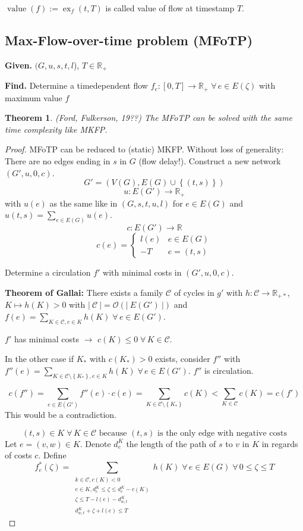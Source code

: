 \documentclass{article}
\newtheorem{theorem}{Theorem}
\newcommand{\card}[1]{\left|\:\!#1\:\!\right|}
\newcommand{\set}[1]{\left\{#1\right\}}
\newcommand{\given}[1]{\textbf{Given.} #1\par}
\newcommand{\find}[1]{\textbf{Find.} #1\par}
\newcommand{\fall}{\;\forall\,}
\begin{document}
$\operatorname{value}(f) := \operatorname{ex}_f(t, T)$ is called value of flow at timestamp $T$.

\subsection{Max-Flow-over-time problem (MFoTP)}
\given{$(G, u, s, t, l$), $T \in \mathbb{R}_+$}
\find{Determine a timedependent flow $f_e: [0, T] \rightarrow \mathbb{R}_+ \fall e \in E(\zeta)$ with maximum value $f$}

\begin{theorem}\label{satz-5.21}
  (Ford, Fulkerson, 19??)
  The MFoTP can be solved with the same time complexity like MKFP.
\end{theorem}

\begin{proof}
  MFoTP can be reduced to (static) MKFP.
  Without loss of generality: There are no edges ending in $s$ in $G$ (flow delay!).
  Construct a new network $(G', u, 0, c)$.
  \[ G' = (V(G), E(G) \cup \set{(t, s)}) \]
  \[ u: E(G') \rightarrow \mathbb{R}_+ \]
  with $u(e)$ as the same like in $(G, s, t, u, l)$ for $e \in E(G)$ and $u(t, s) = \sum_{e \in E(G)} u(e)$.
  \[ c: E(G') \rightarrow \mathbb{R} \]
  \[
    c(e) = \left\{\begin{array}{ll}
      l(e) & e \in E(G) \\
      -T & e = (t, s)
    \end{array}\right.
  \]

  Determine a circulation $f'$ with minimal costs in $(G', u, 0, c)$.

  \textbf{Theorem of Gallai:} There exists a family $\mathcal{C}$ of cycles in $g'$ with $h: \mathcal{C} \rightarrow \mathbb{R}_{+*}$, $K \mapsto h(K) > 0$ with $\card{\mathcal{C}} = \mathcal{O}(\card{E(G')})$ and $f(e) = \sum_{K \in \mathcal{C}, e \in K} h(K) \fall e \in E(G')$.

  $f'$ has minimal costs $\rightarrow$ $c(K) \leq 0 \fall K \in \mathcal{C}$.

  In the other case if $K_*$ with $c(K_*) > 0$ exists, consider $f''$ with $f''(e) = \sum_{K \in \mathcal{C} \setminus \set{K_*}, e \in K} h(K) \fall e \in E(G')$. $f''$ is circulation.

  \[
    c(f'') = \sum_{e \in E(G')} f''(e) \cdot c(e)
      = \sum_{K \in \mathcal{C} \setminus \set{K_*}} c(K)
      < \sum_{K \in \mathcal{C}} c(K)
      = c(f')
  \]
  This would be a contradiction.

  \[
    (t, s) \in K \fall K \in \mathcal{C} \text{ because $(t, s)$ is the only edge with negative costs}
  \]
  Let $e = (v, w) \in K$. Denote $d_e^K$ the length of the path of $s$ to $v$ in $K$ in regards of costs $c$. Define
  \[
    f_e^*(\zeta) =
      \sum_{\substack{
        k \in \mathcal{C}, c(K) < 0 \\
        e \in K, d_e^K \leq \zeta \leq d_e^K - c(K) \\
        \zeta \leq T - l(e) - d_{w,t}^K \\
        d_{w,t}^K + \zeta + l(e) \leq T}}
      h(K)
      \fall e \in E(G) \fall 0 \leq \zeta \leq T
  \]


\end{proof}
\end{document}
